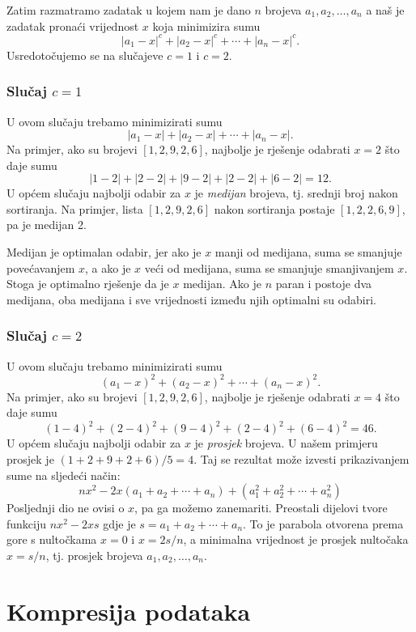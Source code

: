 Zatim razmatramo zadatak u kojem
nam je dano $n$ brojeva $a_1,a_2,\ldots,a_n$
a naš je zadatak pronaći vrijednost $x$
koja minimizira sumu
\[|a_1-x|^c+|a_2-x|^c+\cdots+|a_n-x|^c.\]
Usredotočujemo se na slučajeve $c=1$ i $c=2$.

\subsubsection{Slučaj $c=1$}

U ovom slučaju trebamo minimizirati sumu
\[|a_1-x|+|a_2-x|+\cdots+|a_n-x|.\]
Na primjer, ako su brojevi $[1,2,9,2,6]$,
najbolje je rješenje odabrati $x=2$
što daje sumu
\[
|1-2|+|2-2|+|9-2|+|2-2|+|6-2|=12.
\]
U općem slučaju najbolji odabir za $x$
je \textit{medijan} brojeva,
tj. srednji broj nakon sortiranja.
Na primjer, lista $[1,2,9,2,6]$
nakon sortiranja postaje $[1,2,2,6,9]$,
pa je medijan 2.

Medijan je optimalan odabir,
jer ako je $x$ manji od medijana,
suma se smanjuje povećavanjem $x$,
a ako je $x$ veći od medijana,
suma se smanjuje smanjivanjem $x$.
Stoga je optimalno rješenje da je $x$
medijan.
Ako je $n$ paran i postoje dva medijana,
oba medijana i sve vrijednosti između njih
optimalni su odabiri.

\subsubsection{Slučaj $c=2$}

U ovom slučaju trebamo minimizirati sumu
\[(a_1-x)^2+(a_2-x)^2+\cdots+(a_n-x)^2.\]
Na primjer, ako su brojevi $[1,2,9,2,6]$,
najbolje je rješenje odabrati $x=4$
što daje sumu
\[
(1-4)^2+(2-4)^2+(9-4)^2+(2-4)^2+(6-4)^2=46.
\]
U općem slučaju najbolji odabir za $x$
je \emph{prosjek} brojeva.
U našem primjeru prosjek je $(1+2+9+2+6)/5=4$.
Taj se rezultat može izvesti prikazivanjem
sume na sljedeći način:
\[
nx^2 - 2x(a_1+a_2+\cdots+a_n) + (a_1^2+a_2^2+\cdots+a_n^2)
\]
Posljednji dio ne ovisi o $x$,
pa ga možemo zanemariti.
Preostali dijelovi tvore funkciju
$nx^2-2xs$ gdje je $s=a_1+a_2+\cdots+a_n$.
To je parabola otvorena prema gore
s nultočkama $x=0$ i $x=2s/n$,
a minimalna vrijednost je prosjek
nultočaka $x=s/n$, tj.
prosjek brojeva $a_1,a_2,\ldots,a_n$.

\section{Kompresija podataka}


